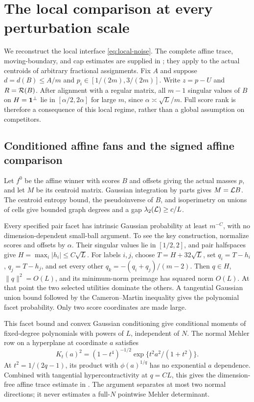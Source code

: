 \section{The local comparison at every perturbation scale}
\label{sec:local-proof}
We reconstruct the local interface \eqref{eq:local-noise}. The complete
affine trace, moving-boundary, and cap estimates are supplied in
\cite{currentlocal,localboundary,localsmallcap,localsigned}; they apply to
the actual centroids of arbitrary fractional assignments.
Fix $A$ and suppose $d=d(B)\le A/m$ and
$p_i\in[1/(2m),3/(2m)]$. Write $z=p-U$ and $R=\mathcal R(B)$.
After alignment with a regular matrix, all $m-1$ singular values of
$B$ on $H=\mathbf 1^\perp$ lie in $[\alpha/2,2\alpha]$ for large $m$, since
$\alpha\asymp\sqrt L/m$. Full score rank is therefore a consequence
of this local regime, rather than a global assumption on competitors.

\subsection{Conditioned affine fans and the signed affine comparison}
Let $f^0$ be the affine winner with scores $B$ and offsets giving the
actual masses $p$, and let $M$ be its centroid matrix.
Gaussian integration by parts gives $M=\mathcal L B$.
The centroid entropy bound, the pseudoinverse of $B$, and isoperimetry
on unions of cells give bounded graph degrees and a gap
$\lambda_2(\mathcal L)\ge c/L$.

Every specified pair facet has intrinsic Gaussian probability at least
$m^{-C}$, with no dimension-dependent small-ball argument. To see the
key construction, normalize scores and offsets by $\alpha$. Their
singular values lie in $[1/2,2]$, and pair halfspaces give
$H=\max_i|h_i|\le C\sqrt L$. For labels $i,j$, choose
$T=H+32\sqrt L$, set $q_i=T-h_i$, $q_j=T-h_j$, and set every other
$q_k=-(q_i+q_j)/(m-2)$. Then $q\in H$, $\|q\|^2=O(L)$, and its
minimum-norm preimage has squared norm $O(L)$. At that point the two
selected utilities dominate the others. A tangential Gaussian union
bound followed by the Cameron--Martin inequality gives the polynomial
facet probability. Only two score coordinates are made large.

This facet bound and convex Gaussian conditioning give conditional moments
of fixed-degree polynomials with powers of $L$, independent of $N$.
The normal Mehler row on a hyperplane at coordinate $a$ satisfies
\[
 K_t(a)^2=(1-t^4)^{-1/2}
           \exp\{t^2a^2/(1+t^2)\}.
\]
At $t^2=1/(2q-1)$, its product with $\phi(a)^{1/q}$ has no exponential
$a$ dependence. Combined with tangential hypercontractivity at $q=CL$,
this gives the dimension-free affine trace estimate in
\cite{localboundary}. The argument separates at most two normal directions;
it never estimates a full-$N$ pointwise Mehler determinant.

